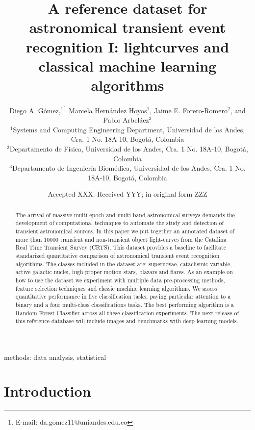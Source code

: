 \documentclass[a4paper,fleqn,usenatbib]{mnras}
\title[A reference transient dataset I: lightcurves]{A reference dataset for astronomical transient event recognition I: lightcurves and classical machine learning algorithms}
\author[Diego. A. G\'omez et al.]{
{Diego A. G\'omez,$^{1}$\thanks{E-mail: da.gomez11@uniandes.edu.co}}
Marcela Hern\'andez Hoyos$^{1}$,   
Jaime E. Forero-Romero$^{2}$,
\newauthor
and Pablo Arbel\'aez$^{3}$
\\
$^{1}$Systems and Computing Engineering Department, Universidad de los Andes, Cra. 1 No. 18A-10, Bogot\'a, Colombia\\
$^{2}$Departamento de F\'isica, Universidad de los Andes, Cra. 1 No. 18A-10, Bogot\'a, Colombia\\
$^{3}$Departamento de Ingenier\'ia Biom\'edica, Universidad de los Andes, Cra. 1 No. 18A-10, Bogot\'a, Colombia
}
\date{Accepted XXX. Received YYY; in original form ZZZ}
\begin{document}
\label{firstpage}
\pagerange{\pageref{firstpage}--\pageref{lastpage}}
\maketitle

\begin{abstract}

The arrival of massive multi-epoch and multi-band astronomical surveys
demands the development of computational techniques to automate the
study and detection of transient astronomical sources. 
In this paper we put together an annotated dataset of more than
$10000$ transient and non-transient object light-curves from the Catalina Real
Time Transient Survey (CRTS).
This dataset provides a baseline to facilitate standarized
quantitative comparison of astronomical transient event recognition
algorithms.   
The classes included in the dataset are: supernovae, cataclismic
variable, active galactic nuclei, high proper motion stars, blazars
and flares.
As an example on how to use the dataset we experiment with multiple data pre-processing methods,
feature selection techniques and classic machine learning algorithms. 
We assess quantitative performance in five classification tasks, paying particular
attention to a binary and a four multi-class classifications tasks.  
The best performing algorithm is a Random Forest Classifier across all
these classification experiments. 
The next release of this reference database will include images and
benchmarks with deep learning models.
\end{abstract}

\begin{keywords}
methods: data analysis, statistical
\end{keywords}



\section{Introduction}
\end{document}

